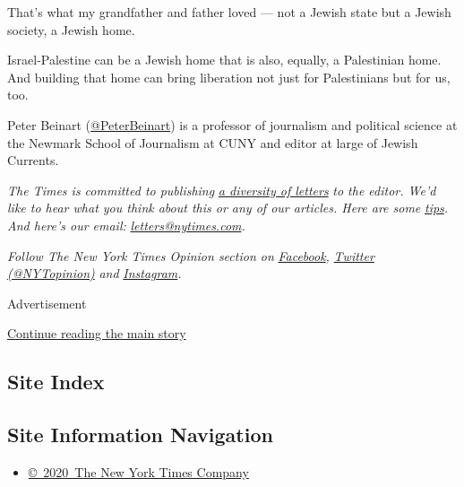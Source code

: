That's what my grandfather and father loved --- not a Jewish state but a
Jewish society, a Jewish home.

Israel-Palestine can be a Jewish home that is also, equally, a
Palestinian home. And building that home can bring liberation not just
for Palestinians but for us, too.

Peter Beinart (\href{https://twitter.com/PeterBeinart}{@PeterBeinart})
is a professor of journalism and political science at the Newmark School
of Journalism at CUNY and editor at large of Jewish Currents.

\emph{The Times is committed to publishing}
\href{https://www.nytimes.com/2019/01/31/opinion/letters/letters-to-editor-new-york-times-women.html}{\emph{a
diversity of letters}} \emph{to the editor. We'd like to hear what you
think about this or any of our articles. Here are some}
\href{https://help.nytimes.com/hc/en-us/articles/115014925288-How-to-submit-a-letter-to-the-editor}{\emph{tips}}\emph{.
And here's our email:}
\href{mailto:letters@nytimes.com}{\emph{letters@nytimes.com}}\emph{.}

\emph{Follow The New York Times Opinion section on}
\href{https://www.facebook.com/nytopinion}{\emph{Facebook}}\emph{,}
\href{http://twitter.com/NYTOpinion}{\emph{Twitter (@NYTopinion)}}
\emph{and}
\href{https://www.instagram.com/nytopinion/}{\emph{Instagram}}\emph{.}

Advertisement

\protect\hyperlink{after-bottom}{Continue reading the main story}

\hypertarget{site-index}{%
\subsection{Site Index}\label{site-index}}

\hypertarget{site-information-navigation}{%
\subsection{Site Information
Navigation}\label{site-information-navigation}}

\begin{itemize}
\tightlist
\item
  \href{https://help.nytimes.com/hc/en-us/articles/115014792127-Copyright-notice}{©~2020~The
  New York Times Company}
\end{itemize}

